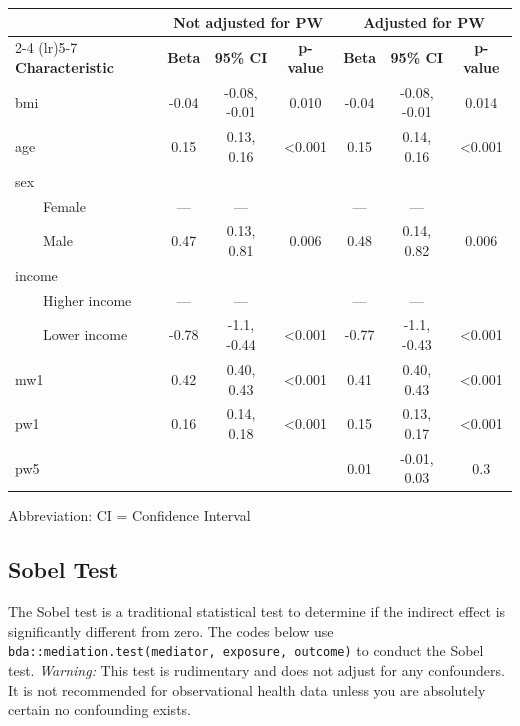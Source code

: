 \documentclass[
]{book}
\begin{document}
\begin{table}[t]
\fontsize{12.0pt}{14.0pt}\selectfont
\begin{tabular*}{\linewidth}{@{\extracolsep{\fill}}lcccccc}
\toprule
 & \multicolumn{3}{c}{{Not adjusted for PW}} & \multicolumn{3}{c}{{Adjusted for PW}} \\ 
\cmidrule(lr){2-4} \cmidrule(lr){5-7}
\textbf{Characteristic} & \textbf{Beta} & \textbf{95\% CI} & \textbf{p-value} & \textbf{Beta} & \textbf{95\% CI} & \textbf{p-value} \\ 
\midrule\addlinespace[2.5pt]
bmi & -0.04 & -0.08, -0.01 & 0.010 & -0.04 & -0.08, -0.01 & 0.014 \\ 
age & 0.15 & 0.13, 0.16 & <0.001 & 0.15 & 0.14, 0.16 & <0.001 \\ 
sex &  &  &  &  &  &  \\ 
    Female & — & — &  & — & — &  \\ 
    Male & 0.47 & 0.13, 0.81 & 0.006 & 0.48 & 0.14, 0.82 & 0.006 \\ 
income &  &  &  &  &  &  \\ 
    Higher income & — & — &  & — & — &  \\ 
    Lower income & -0.78 & -1.1, -0.44 & <0.001 & -0.77 & -1.1, -0.43 & <0.001 \\ 
mw1 & 0.42 & 0.40, 0.43 & <0.001 & 0.41 & 0.40, 0.43 & <0.001 \\ 
pw1 & 0.16 & 0.14, 0.18 & <0.001 & 0.15 & 0.13, 0.17 & <0.001 \\ 
pw5 &  &  &  & 0.01 & -0.01, 0.03 & 0.3 \\ 
\bottomrule
\end{tabular*}
\begin{minipage}{\linewidth}
\vspace{.05em}
Abbreviation: CI = Confidence Interval\\
\end{minipage}
\end{table}

\subsection{Sobel Test}\label{sobel-test}

The Sobel test is a traditional statistical test to determine if the indirect effect is significantly different from zero. The codes below use \texttt{bda::mediation.test(mediator,\ exposure,\ outcome)} to conduct the Sobel test. \emph{Warning:} This test is rudimentary and does not adjust for any confounders. It is not recommended for observational health data unless you are absolutely certain no confounding exists.
\end{document}
